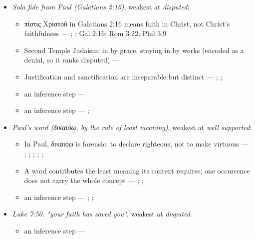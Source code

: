 \documentclass[11pt]{article}
\begin{document}
\begin{itemize}
\item \emph{Sola fide from Paul (Galatians 2:16)}, weakest at \emph{disputed}:
\begin{itemize}
\item πίστις Χριστοῦ in Galatians 2:16 means faith in Christ, not Christ's faithfulness --- \cite{dunn-once-more-pistis-christou-1991}; \cite{matlock-detheologizing-2000}; Gal 2:16; Rom 3:22; Phil 3:9
\item Second Temple Judaism: in by grace, staying in by works (encoded as a denial, so it ranks disputed) --- \cite{sanders-paul-palestinian-judaism-1977}
\item Justification and sanctification are inseparable but distinct --- \cite[XIII.1]{westminster-confession-1647}; \cite[XI.1]{westminster-confession-1647}; \cite[III.xi.6]{calvin-institutes-1960}
\item an inference step --- \cite[Trent, Session VI (1547), canon 9]{tanner-decrees-1990}
\item an inference step --- \cite{gathercole-where-boasting-2002}; \cite{carson-variegated-nomism-1-2001}
\end{itemize}
\item \emph{Paul's word (δικαιόω, by the rule of least meaning)}, weakest at \emph{well supported}:
\begin{itemize}
\item In Paul, δικαιόω is forensic: to declare righteous, not to make virtuous --- \cite[s.v. δικαιόω]{bauer-danker-lexicon-2000}; \cite{morris-apostolic-preaching-1965}; \cite[p. 80]{moo-romans-1996}; \cite{irons-righteousness-of-god-2015}; \cite{wright-justification-2009}; \cite[ad loc. Rom 3:24]{fitzmyer-romans-1993}
\item A word contributes the least meaning its context requires; one occurrence does not carry the whole concept --- \cite{silva-biblical-words-1994}; \cite{joos-semantic-axiom-1972}; \cite{barr-semantics-2004}
\item an inference step --- \cite{silva-biblical-words-1994}; \cite[p. 80]{moo-romans-1996}; \cite{barr-semantics-2004}
\end{itemize}
\item \emph{Luke 7:50: "your faith has saved you"}, weakest at \emph{disputed}:
\begin{itemize}
\item an inference step --- \cite[Trent, Session VI (1547), canon 9]{tanner-decrees-1990}
\end{itemize}

\end{itemize}
\end{document}
